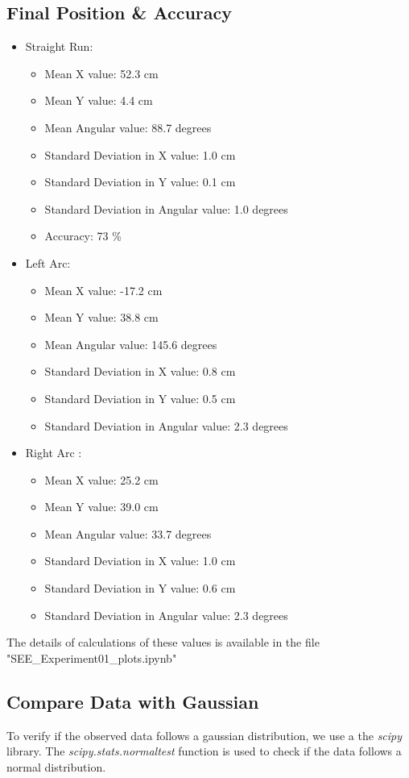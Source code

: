 \documentclass[10pt,a4paper]{article}
\begin{document}
			\subsection{Final Position \& Accuracy }
			\begin{itemize}
				\item Straight Run:		
					\begin{itemize}
						\item Mean X value: 52.3 cm
						\item Mean Y value: 4.4 cm
						\item Mean Angular value: 88.7 degrees
						\item Standard Deviation in X value: 1.0 cm
						\item Standard Deviation in Y value: 0.1 cm
						\item Standard Deviation in Angular value: 1.0 degrees
						\item Accuracy: 73 \%
					\end{itemize}
				\item Left Arc:
					\begin{itemize}
						\item Mean X value: -17.2 cm
						\item Mean Y value: 38.8 cm
						\item Mean Angular value: 145.6 degrees
						\item Standard Deviation in X value: 0.8 cm
						\item Standard Deviation in Y value: 0.5 cm
						\item Standard Deviation in Angular value: 2.3 degrees
					\end{itemize}
				\item Right Arc	:
					\begin{itemize}
						\item Mean X value: 25.2 cm
						\item Mean Y value: 39.0 cm
						\item Mean Angular value: 33.7 degrees
						\item Standard Deviation in X value: 1.0 cm
						\item Standard Deviation in Y value: 0.6 cm
						\item Standard Deviation in Angular value: 2.3 degrees
					\end{itemize}	
			\end{itemize}
			The details of calculations of these values is available in the file "SEE\_Experiment01\_plots.ipynb"
			\subsection{Compare Data with Gaussian}
			To verify if the observed data follows a gaussian distribution, we use a the \textit{scipy} library. The \textit{scipy.stats.normaltest} function is used to check if the data follows a normal distribution. 
			
\end{document}
